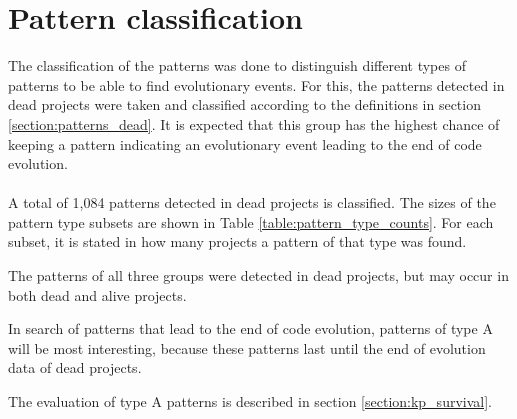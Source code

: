 \section{Pattern classification}
The classification of the patterns was done to distinguish different types of
patterns to be able to find evolutionary events. For this, the patterns
detected in dead projects were taken and classified according to
the definitions in section \ref{section:patterns_dead}. It is expected that
this group has the highest chance of keeping a pattern indicating an
evolutionary event leading to the end of code evolution.

\paragraph{}
A total of 1,084 patterns detected in dead projects is classified. The sizes of
the pattern type subsets are shown in Table \ref{table:pattern_type_counts}.
For each subset, it is stated in how many projects a pattern of that type was
found.



\noindent
The patterns of all three groups were detected in dead projects, but may occur
in both dead and alive projects.

In search of patterns that lead to the end of code evolution, patterns of type
A will be most interesting, because these patterns last until the end of
evolution data of dead projects.

The evaluation of type A patterns is described in section
\ref{section:kp_survival}.

\begin{comment}
- Factual results
- Tables and figures for clarification

This chapter presents and clarifies the results obtained during the research.
The focus should be on the factual results, not the interpretation or
discussion. Tables and graphics should be used to increase the clarity of the
results where applicable.
Have a look at the the results chapter in this example thesis on Paul’s
homepage\footnote{http://homepages.cwi.nl/~paulk/thesesMasterSoftwareEngineering/2006/ArnoldLankamp.pdf}.
\end{comment}
